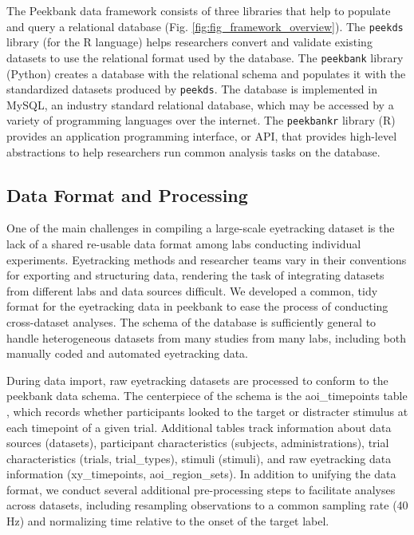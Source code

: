 \documentclass[10pt, letterpaper]{article}
\begin{document}
The Peekbank data framework consists of three libraries that help to
populate and query a relational database (Fig.
\ref{fig:fig_framework_overview}). The \texttt{peekds} library (for the
R language) helps researchers convert and validate existing datasets to
use the relational format used by the database. The \texttt{peekbank}
library (Python) creates a database with the relational schema and
populates it with the standardized datasets produced by \texttt{peekds}.
The database is implemented in MySQL, an industry standard relational
database, which may be accessed by a variety of programming languages
over the internet. The \texttt{peekbankr} library (R) provides an
application programming interface, or API, that provides high-level
abstractions to help researchers run common analysis tasks on the
database.

\hypertarget{data-format-and-processing}{%
\subsection{Data Format and
Processing}\label{data-format-and-processing}}

One of the main challenges in compiling a large-scale eyetracking
dataset is the lack of a shared re-usable data format among labs
conducting individual experiments. Eyetracking methods and researcher
teams vary in their conventions for exporting and structuring data,
rendering the task of integrating datasets from different labs and data
sources difficult. We developed a common, tidy format for the
eyetracking data in peekbank to ease the process of conducting
cross-dataset analyses. The schema of the database is sufficiently
general to handle heterogeneous datasets from many studies from many
labs, including both manually coded and automated eyetracking data.

During data import, raw eyetracking datasets are processed to conform to
the peekbank data schema. The centerpiece of the schema is the
aoi\_timepoints table , which records whether participants looked to the
target or distracter stimulus at each timepoint of a given trial.
Additional tables track information about data sources (datasets),
participant characteristics (subjects, administrations), trial
characteristics (trials, trial\_types), stimuli (stimuli), and raw
eyetracking data information (xy\_timepoints, aoi\_region\_sets). In
addition to unifying the data format, we conduct several additional
pre-processing steps to facilitate analyses across datasets, including
resampling observations to a common sampling rate (40 Hz) and
normalizing time relative to the onset of the target label.
\end{document}
